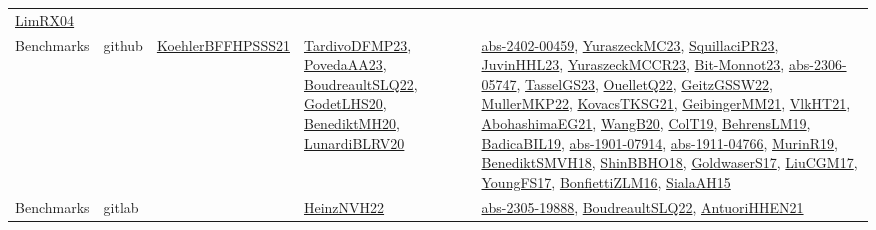 {\begin{longtable}{lp{3cm}>{\raggedright}p{6cm}>{\raggedright}p{6cm}p{8cm}}
\href{papers/LimRX04.pdf}{LimRX04}\cite{LimRX04}\\
Benchmarks & github & \href{articles/KoehlerBFFHPSSS21.pdf}{KoehlerBFFHPSSS21}\cite{KoehlerBFFHPSSS21} & \href{papers/TardivoDFMP23.pdf}{TardivoDFMP23}\cite{TardivoDFMP23}, \href{papers/PovedaAA23.pdf}{PovedaAA23}\cite{PovedaAA23}, \href{papers/BoudreaultSLQ22.pdf}{BoudreaultSLQ22}\cite{BoudreaultSLQ22}, \href{papers/GodetLHS20.pdf}{GodetLHS20}\cite{GodetLHS20}, \href{articles/BenediktMH20.pdf}{BenediktMH20}\cite{BenediktMH20}, \href{articles/LunardiBLRV20.pdf}{LunardiBLRV20}\cite{LunardiBLRV20} & \href{articles/abs-2402-00459.pdf}{abs-2402-00459}\cite{abs-2402-00459}, \href{papers/YuraszeckMC23.pdf}{YuraszeckMC23}\cite{YuraszeckMC23}, \href{papers/SquillaciPR23.pdf}{SquillaciPR23}\cite{SquillaciPR23}, \href{papers/JuvinHHL23.pdf}{JuvinHHL23}\cite{JuvinHHL23}, \href{articles/YuraszeckMCCR23.pdf}{YuraszeckMCCR23}\cite{YuraszeckMCCR23}, \href{papers/Bit-Monnot23.pdf}{Bit-Monnot23}\cite{Bit-Monnot23}, \href{articles/abs-2306-05747.pdf}{abs-2306-05747}\cite{abs-2306-05747}, \href{papers/TasselGS23.pdf}{TasselGS23}\cite{TasselGS23}, \href{papers/OuelletQ22.pdf}{OuelletQ22}\cite{OuelletQ22}, \href{papers/GeitzGSSW22.pdf}{GeitzGSSW22}\cite{GeitzGSSW22}, \href{articles/MullerMKP22.pdf}{MullerMKP22}\cite{MullerMKP22}, \href{papers/KovacsTKSG21.pdf}{KovacsTKSG21}\cite{KovacsTKSG21}, \href{papers/GeibingerMM21.pdf}{GeibingerMM21}\cite{GeibingerMM21}, \href{articles/VlkHT21.pdf}{VlkHT21}\cite{VlkHT21}, \href{articles/AbohashimaEG21.pdf}{AbohashimaEG21}\cite{AbohashimaEG21}, \href{papers/WangB20.pdf}{WangB20}\cite{WangB20}, \href{papers/ColT19.pdf}{ColT19}\cite{ColT19}, \href{papers/BehrensLM19.pdf}{BehrensLM19}\cite{BehrensLM19}, \href{papers/BadicaBIL19.pdf}{BadicaBIL19}\cite{BadicaBIL19}, \href{articles/abs-1901-07914.pdf}{abs-1901-07914}\cite{abs-1901-07914}, \href{articles/abs-1911-04766.pdf}{abs-1911-04766}\cite{abs-1911-04766}, \href{papers/MurinR19.pdf}{MurinR19}\cite{MurinR19}, \href{papers/BenediktSMVH18.pdf}{BenediktSMVH18}\cite{BenediktSMVH18}, \href{articles/ShinBBHO18.pdf}{ShinBBHO18}\cite{ShinBBHO18}, \href{papers/GoldwaserS17.pdf}{GoldwaserS17}\cite{GoldwaserS17}, \href{papers/LiuCGM17.pdf}{LiuCGM17}\cite{LiuCGM17}, \href{papers/YoungFS17.pdf}{YoungFS17}\cite{YoungFS17}, \href{papers/BonfiettiZLM16.pdf}{BonfiettiZLM16}\cite{BonfiettiZLM16}, \href{papers/SialaAH15.pdf}{SialaAH15}\cite{SialaAH15}\\
Benchmarks & gitlab &  & \href{articles/HeinzNVH22.pdf}{HeinzNVH22}\cite{HeinzNVH22} & \href{articles/abs-2305-19888.pdf}{abs-2305-19888}\cite{abs-2305-19888}, \href{papers/BoudreaultSLQ22.pdf}{BoudreaultSLQ22}\cite{BoudreaultSLQ22}, \href{papers/AntuoriHHEN21.pdf}{AntuoriHHEN21}\cite{AntuoriHHEN21}\\

\end{longtable}}
